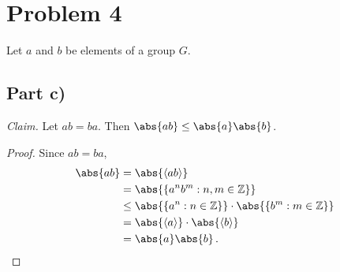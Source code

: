 \documentclass{abrice}
\newcommand{\Z}{\mathbb{Z}}
\newcommand{\Claim}{\noindent\emph{Claim.}\xspace}%
\begin{document}
\section{Problem 4}

Let $a$ and $b$ be elements of a group $G$.

\subsection{Part c)}

\Claim Let $ab = ba$. Then $\abs{ab} \leq \abs{a}\abs{b}$.

\begin{proof}
  Since $ab = ba$,
  \begin{align*}
    \abs{ab}
    &= \abs{\langle ab \rangle} \\
    &= \abs{\{ a^n b^m : n,m \in \Z \}} \\
    &\leq \abs{\{a^n : n \in \Z\}} \cdot \abs{\{b^m : m \in \Z\}} \\
    &= \abs{\langle a \rangle} \cdot \abs{\langle b \rangle} \\
    &= \abs{a} \abs{b}\, . \qedhere
  \end{align*}
\end{proof}
\end{document}
